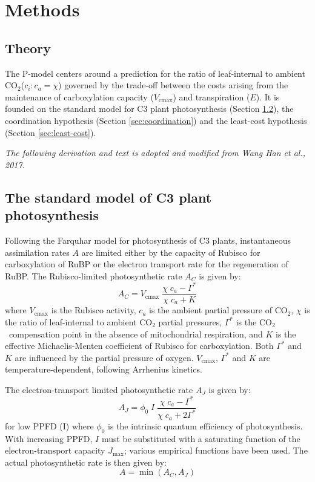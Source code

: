 \documentclass{myreport}
\newcommand{\coo}{CO$_2$}
\begin{document}
\section{Methods}

\subsection{Theory}
\label{sec:theory}
The P-model centers around a prediction for the ratio of leaf-internal to ambient \coo ($c_i : c_a = \chi$) governed by the trade-off between the costs arising from the maintenance of carboxylation capacity ($V_{\mathrm{cmax}}$) and transpiration ($E$). 
It is founded on the standard model for C3 plant photosynthesis (Section \ref{sec:farquhar}), the coordination hypothesis (Section \ref{sec:coordination}) and the least-cost hypothesis (Section \ref{sec:least-cost}).

\textit{The following derivation and text is adopted and modified from Wang Han et al., 2017.}\\

\subsection{The standard model of C3 plant photosynthesis}
\label{sec:farquhar}
Following the Farquhar model for photosynthesis of C3 plants, instantaneous assimilation rates $A$ are limited either by the capacity of Rubisco for carboxylation of RuBP or the electron transport rate for the regeneration of RuBP. 
The Rubisco-limited photosynthetic rate $A_C$ is given by:
\begin{equation}
\label{eq:rubiscolimited}
    A_C = V_{\mathrm{cmax}} \; \frac{\chi\;c_a-\Gamma^{\ast}}{\chi\;c_a + K}
\end{equation}
where $V_{\mathrm{cmax}}$ is the Rubisco activity, $c_a$ is the ambient partial pressure of CO$_2$, $\chi$ is the ratio of leaf-internal to ambient CO$_2$ partial pressures, $\Gamma^{\ast}$ is the \coo\ compensation point in the absence of mitochondrial respiration, and $K$ is the effective Michaelis-Menten coefficient of Rubisco for carboxylation. 
Both $\Gamma^{\ast}$ and $K$ are influenced by the partial pressure of oxygen. 
$V_{\mathrm{cmax}}$, $\Gamma^{\ast}$ and $K$ are temperature-dependent, following Arrhenius kinetics.

The electron-transport limited photosynthetic rate $A_J$ is given by:
\begin{equation}
\label{eq:lightlimited}
    A_J = \phi_0 \; I\; \frac{\chi \; c_a - \Gamma^{\ast}}{\chi\;c_a + 2\Gamma^{\ast}}
\end{equation}
for low PPFD (I) where $\phi_0$ is the intrinsic quantum efficiency of photosynthesis. 
With increasing PPFD, $I$ must be substituted with a saturating function of the electron-transport capacity $J_{\mathrm{max}}$; various empirical functions have been used. 
The actual photosynthetic rate is then given by:
\begin{equation}
    A = \min(A_C, A_J)
\end{equation}
\end{document}
